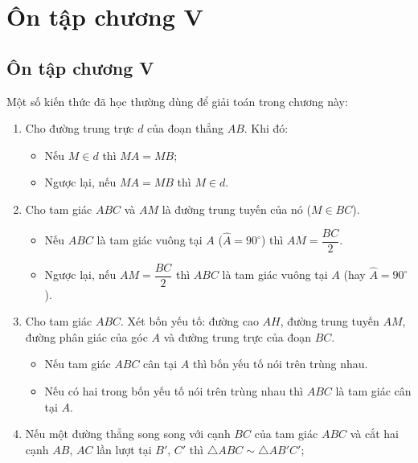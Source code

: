 \section*{Ôn tập chương V}

\begin{practice}
    \subsection{Ôn tập chương V}

    Một số kiến thức đã học thường dùng để giải toán trong chương này:

    \begin{enumerate}
        \item Cho đường trung trực $d$ của đoạn thẳng $AB$. Khi đó:
        \begin{itemize}
            \item Nếu $M\in d$ thì $MA=MB$;
            \item Ngược lại, nếu $MA=MB$ thì $M\in d$.
        \end{itemize}

        \item Cho tam giác $ABC$ và $AM$ là đường trung tuyến của nó ($M\in BC$).
        \begin{itemize}
            \item Nếu $ABC$ là tam giác vuông tại $A$ ($\widehat A=90^\circ$) thì $AM=\dfrac{BC}{2}$.
            \item Ngược lại, nếu $AM=\dfrac{BC}{2}$ thì $ABC$ là tam giác vuông tại $A$ (hay $\widehat A=90^\circ$).
        \end{itemize}

        \item Cho tam giác $ABC$. Xét bốn yếu tố: đường cao $AH$, đường trung tuyến $AM$, đường phân giác của góc $A$ và đường trung trực của đoạn $BC$.
        \begin{itemize}
            \item Nếu tam giác $ABC$ cân tại $A$ thì bốn yếu tố nói trên trùng nhau.
            \item Nếu có hai trong bốn yếu tố nói trên trùng nhau thì $ABC$ là tam giác cân tại $A$.
        \end{itemize}

        \item Nếu một đường thẳng song song với cạnh $BC$ của tam giác $ABC$ và cắt hai cạnh $AB$, $AC$ lần lượt tại $B'$, $C'$ thì $\triangle ABC\sim\triangle AB'C'$;


\end{enumerate}
\end{practice}

